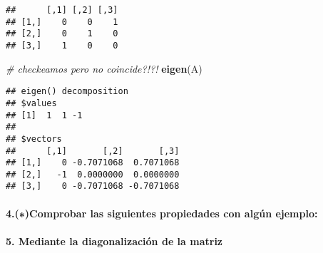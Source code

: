\documentclass[]{article}
\newenvironment{Shaded}{\begin{snugshade}}{\end{snugshade}}
\newcommand{\CommentTok}[1]{\textcolor[rgb]{0.56,0.35,0.01}{\textit{#1}}}
\newcommand{\DecValTok}[1]{\textcolor[rgb]{0.00,0.00,0.81}{#1}}
\newcommand{\KeywordTok}[1]{\textcolor[rgb]{0.13,0.29,0.53}{\textbf{#1}}}
\newcommand{\NormalTok}[1]{#1}
\newcommand{\OperatorTok}[1]{\textcolor[rgb]{0.81,0.36,0.00}{\textbf{#1}}}
\newcommand{\StringTok}[1]{\textcolor[rgb]{0.31,0.60,0.02}{#1}}
\let\oldparagraph\paragraph
\renewcommand{\paragraph}[1]{\oldparagraph{#1}\mbox{}}
\begin{document}
\begin{Shaded}
\end{Shaded}

\begin{verbatim}
##      [,1] [,2] [,3]
## [1,]    0    0    1
## [2,]    0    1    0
## [3,]    1    0    0
\end{verbatim}

\begin{Shaded}
\begin{Highlighting}[]
\CommentTok{# checkeamos pero no coincide?!?!}
\KeywordTok{eigen}\NormalTok{(A)}
\end{Highlighting}
\end{Shaded}

\begin{verbatim}
## eigen() decomposition
## $values
## [1]  1  1 -1
## 
## $vectors
##      [,1]       [,2]       [,3]
## [1,]    0 -0.7071068  0.7071068
## [2,]   -1  0.0000000  0.0000000
## [3,]    0 -0.7071068 -0.7071068
\end{verbatim}

\hypertarget{comprobar-las-siguientes-propiedades-con-algun-ejemplo}{%
\paragraph{4.(∗)Comprobar las siguientes propiedades con algún
ejemplo:}\label{comprobar-las-siguientes-propiedades-con-algun-ejemplo}}

\hypertarget{mediante-la-diagonalizacion-de-la-matriz}{%
\paragraph{5. Mediante la diagonalización de la
matriz}\label{mediante-la-diagonalizacion-de-la-matriz}}
\end{document}
